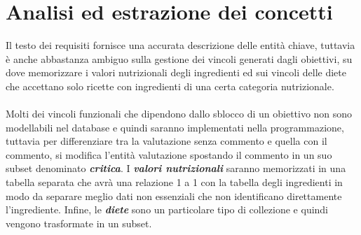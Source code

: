 ﻿\documentclass[a4paper,12pt]{report}
\begin{document}
\section{Analisi ed estrazione dei concetti}
Il testo dei requisiti fornisce una accurata descrizione delle entità chiave, tuttavia è anche abbastanza ambiguo sulla gestione dei vincoli generati dagli obiettivi, su dove memorizzare i valori nutrizionali degli ingredienti ed sui vincoli delle diete che accettano solo ricette con ingredienti di una certa categoria nutrizionale.
\\\\
Molti dei vincoli funzionali che dipendono dallo sblocco di un obiettivo non sono modellabili nel database e quindi saranno implementati nella programmazione, tuttavia per differenziare tra la valutazione senza commento e quella con il commento, si modifica l'entità valutazione spostando il commento in un suo subset denominato 
\textbf{\textit{critica}}. I \textbf{\textit{valori nutrizionali}} saranno memorizzati in una tabella separata che avrà una relazione 1 a 1 con la tabella degli ingredienti in modo da separare meglio dati non essenziali che non identificano direttamente l'ingrediente. Infine, le 
\textbf{\textit{diete}} sono un particolare tipo di collezione e quindi vengono trasformate in un subset.
\end{document}
